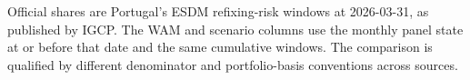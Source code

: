 \begin{table}[H]
\centering
\caption{Official ESDM refixing benchmark, WAM proxy, and scenario kernel}
\label{tab:refixing-comparison}
\par\smallskip
\parbox{0.92\textwidth}{\small Official shares are Portugal's ESDM refixing-risk windows at 2026-03-31, as published by IGCP. The WAM and scenario columns use the monthly panel state at or before that date and the same cumulative windows. The comparison is qualified by different denominator and portfolio-basis conventions across sources.}
\end{table}
